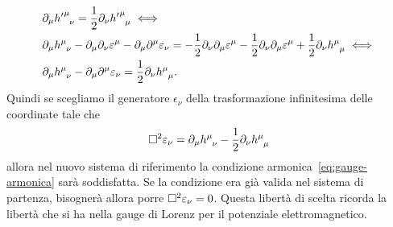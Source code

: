 \begin{equation}
  \begin{split}
    &\partial_{\mu} \tensor{{h'}}{^{\mu}_{\nu}} = \frac{1}{2}\partial_{\nu}
    \tensor{{h'}}{^{\mu}_{\mu}} \iff \\
    &\partial_{\mu} \tensor{h}{^{\mu}_{\nu}}
    - \partial_{\mu} \partial_{\nu} \epsilon^{\mu}
    - \partial_{\mu}\partial^{\mu} \epsilon_{\nu}
    = -\frac{1}{2} \partial_{\nu} \partial_{\mu} \epsilon^{\mu} -
    \frac{1}{2}\partial_{\nu} \partial_{\mu} \epsilon^{\mu} +
    \frac{1}{2} \partial_{\nu} \tensor{h}{^{\mu}_{\mu}} \iff \\
    &\partial_{\mu} \tensor{h}{^{\mu}_{\nu}}
    - \partial_{\mu}\partial^{\mu} \epsilon_{\nu}
    = \frac{1}{2} \partial_{\nu} \tensor{h}{^{\mu}_{\mu}}.
  \end{split}
\end{equation}
Quindi se scegliamo il generatore $\epsilon_{\nu}$ della trasformazione
infinitesima delle coordinate tale che
\begin{equation}
  \dalamb \epsilon_{\nu} = \partial_{\mu} \tensor{h}{^{\mu}_{\nu}} -
  \frac{1}{2} \partial_{\nu} \tensor{h}{^{\mu}_{\mu}}
\end{equation}
allora nel nuovo sistema di riferimento la condizione
armonica~\eqref{eq:gauge-armonica} sarà soddisfatta.  Se la condizione era già
valida nel sistema di partenza, bisognerà allora porre
$\Box^{2} \varepsilon_{\nu} = 0$.  Questa libertà di scelta ricorda la libertà che
si ha nella gauge di Lorenz per il potenziale elettromagnetico.

